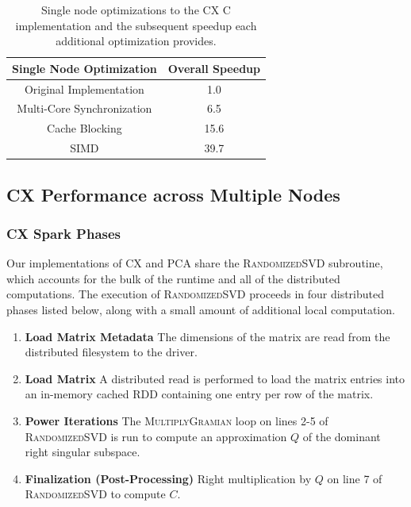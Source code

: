  
  \begin{table}
  \begin{center}
  \begin{tabular}{ |c|c| } 
  \hline
  Single Node Optimization & Overall Speedup\\
  \hline
  Original Implementation & 1.0  \\
  Multi-Core Synchronization & 6.5 \\
  Cache Blocking & 15.6 \\
  SIMD & 39.7 \\
  \hline

  \end{tabular}
  \end{center}
  \caption{Single node optimizations to the CX C implementation and
  the subsequent speedup  each additional optimization provides.}
  \label{tab:single_node}
  \end{table}
 



  \subsection{CX Performance across Multiple Nodes}

  \subsubsection{CX Spark Phases}
  Our implementations of CX and PCA share the \textsc{RandomizedSVD} subroutine, which accounts for the bulk of the runtime and all of the distributed computations.
  The execution of \textsc{RandomizedSVD} proceeds in four distributed phases listed below, along with a small amount of additional local computation.
  \begin{enumerate}
      \item \textbf{Load Matrix Metadata}
         The dimensions of the matrix are read from the distributed filesystem to the driver.
      \item \textbf{Load Matrix}
         A distributed read is performed to load the matrix entries into an in-memory cached
         RDD containing one entry per row of the matrix.
      \item \textbf{Power Iterations}
         The \textsc{MultiplyGramian} loop on lines 2-5 of
         \textsc{RandomizedSVD} is run to compute an approximation $Q$
         of the dominant right singular subspace.
       \item \textbf{Finalization (Post-Processing)}
         Right multiplication by $Q$ on line 7 of \textsc{RandomizedSVD} to compute $C$.
  \end{enumerate}

